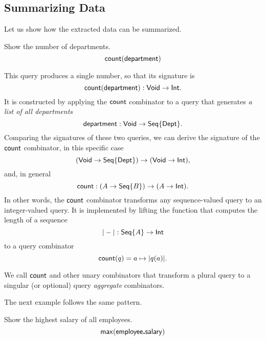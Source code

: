 

\subsection*{Summarizing Data}

Let us show how the extracted data can be summarized.

\begin{demo}
    \label{ex:count-department}
    Show the number of departments.
    \begin{equation*}
        \mathsf{count}(\mathsf{department})
    \end{equation*}
\end{demo}

This query produces a single number, so that its signature is
\begin{equation*}
    \mathsf{count}(\mathsf{department}) : \mathsf{Void} \to \mathsf{Int}.
\end{equation*}
It is constructed by applying the $\mathsf{count}$ combinator to a query that generates
\emph{a list of all departments}
\begin{equation*}
    \mathsf{department} : \mathsf{Void} \to \mathsf{Seq}{\left\{\mathsf{Dept}\right\}}.
\end{equation*}
Comparing the signatures of these two queries, we can derive the signature of
the $\mathsf{count}$ combinator, in this specific case
\begin{equation*}
    (\mathsf{Void} \to \mathsf{Seq}{\left\{\mathsf{Dept}\right\}}) \to (\mathsf{Void} \to \mathsf{Int}),
\end{equation*}
and, in general
\begin{equation*}
    \mathsf{count}: (A \to \mathsf{Seq}{\left\{B\right\}}) \to (A \to \mathsf{Int}).
\end{equation*}
In other words, the $\mathsf{count}$ combinator transforms any sequence-valued query
to an integer-valued query.  It is implemented by lifting the function that
computes the length of a sequence
\begin{equation*}
    |-| : \mathsf{Seq}{\left\{A\right\}} \to \mathsf{Int}
\end{equation*}
to a query combinator
\begin{equation*}
    \mathsf{count}(q) = a \mapsto |q(a)|.
\end{equation*}

We call $\mathsf{count}$ and other unary combinators that transform a plural query to a
singular (or optional) query \emph{aggregate} combinators.

The next example follows the same pattern.

\begin{demo}
    \label{ex:max-employee-salary}
    Show the highest salary of all employees.
    \begin{equation*}
        \mathsf{max}(\mathsf{employee}\boldsymbol{.}\mathsf{salary})
    \end{equation*}
\end{demo}

